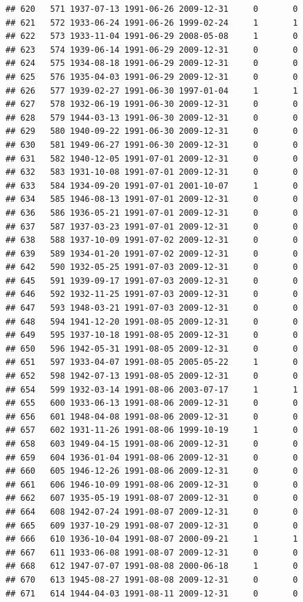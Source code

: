 \documentclass[
]{book}
\theoremstyle{definition}
\theoremstyle{definition}
\theoremstyle{definition}
\theoremstyle{definition}
\theoremstyle{remark}
\begin{document}
\begin{verbatim}
## 620   571 1937-07-13 1991-06-26 2009-12-31     0       0
## 621   572 1933-06-24 1991-06-26 1999-02-24     1       1
## 622   573 1933-11-04 1991-06-29 2008-05-08     1       0
## 623   574 1939-06-14 1991-06-29 2009-12-31     0       0
## 624   575 1934-08-18 1991-06-29 2009-12-31     0       0
## 625   576 1935-04-03 1991-06-29 2009-12-31     0       0
## 626   577 1939-02-27 1991-06-30 1997-01-04     1       1
## 627   578 1932-06-19 1991-06-30 2009-12-31     0       0
## 628   579 1944-03-13 1991-06-30 2009-12-31     0       0
## 629   580 1940-09-22 1991-06-30 2009-12-31     0       0
## 630   581 1949-06-27 1991-06-30 2009-12-31     0       0
## 631   582 1940-12-05 1991-07-01 2009-12-31     0       0
## 632   583 1931-10-08 1991-07-01 2009-12-31     0       0
## 633   584 1934-09-20 1991-07-01 2001-10-07     1       0
## 634   585 1946-08-13 1991-07-01 2009-12-31     0       0
## 636   586 1936-05-21 1991-07-01 2009-12-31     0       0
## 637   587 1937-03-23 1991-07-01 2009-12-31     0       0
## 638   588 1937-10-09 1991-07-02 2009-12-31     0       0
## 639   589 1934-01-20 1991-07-02 2009-12-31     0       0
## 642   590 1932-05-25 1991-07-03 2009-12-31     0       0
## 645   591 1939-09-17 1991-07-03 2009-12-31     0       0
## 646   592 1932-11-25 1991-07-03 2009-12-31     0       0
## 647   593 1948-03-21 1991-07-03 2009-12-31     0       0
## 648   594 1941-12-20 1991-08-05 2009-12-31     0       0
## 649   595 1937-10-18 1991-08-05 2009-12-31     0       0
## 650   596 1942-05-31 1991-08-05 2009-12-31     0       0
## 651   597 1933-04-07 1991-08-05 2005-05-22     1       0
## 652   598 1942-07-13 1991-08-05 2009-12-31     0       0
## 654   599 1932-03-14 1991-08-06 2003-07-17     1       1
## 655   600 1933-06-13 1991-08-06 2009-12-31     0       0
## 656   601 1948-04-08 1991-08-06 2009-12-31     0       0
## 657   602 1931-11-26 1991-08-06 1999-10-19     1       0
## 658   603 1949-04-15 1991-08-06 2009-12-31     0       0
## 659   604 1936-01-04 1991-08-06 2009-12-31     0       0
## 660   605 1946-12-26 1991-08-06 2009-12-31     0       0
## 661   606 1946-10-09 1991-08-06 2009-12-31     0       0
## 662   607 1935-05-19 1991-08-07 2009-12-31     0       0
## 664   608 1942-07-24 1991-08-07 2009-12-31     0       0
## 665   609 1937-10-29 1991-08-07 2009-12-31     0       0
## 666   610 1936-10-04 1991-08-07 2000-09-21     1       1
## 667   611 1933-06-08 1991-08-07 2009-12-31     0       0
## 668   612 1947-07-07 1991-08-08 2000-06-18     1       0
## 670   613 1945-08-27 1991-08-08 2009-12-31     0       0
## 671   614 1944-04-03 1991-08-11 2009-12-31     0       0

\end{verbatim}
\end{document}
